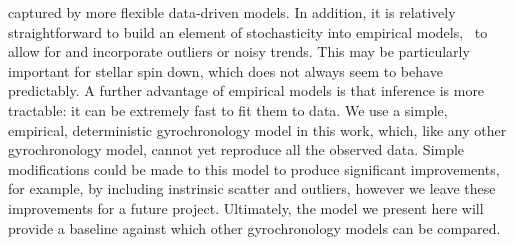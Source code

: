 captured by more flexible data-driven models.
In addition, it is relatively straightforward to build an element of
stochasticity into empirical models, \ie\ to allow for and incorporate
outliers or noisy trends.
This may be particularly important for stellar spin down, which does not
always seem to behave predictably.
A further advantage of empirical models is that inference is more tractable:
it can be extremely fast to fit them to data.
We use a simple, empirical, deterministic gyrochronology model in this work,
which, like any other gyrochronology model, cannot yet reproduce all the
observed data.
Simple modifications could be made to this model to produce
significant improvements, for example, by including instrinsic scatter and
outliers, however we leave these improvements for a future project.
Ultimately, the model we present here will provide a baseline against which
other gyrochronology models can be compared.

